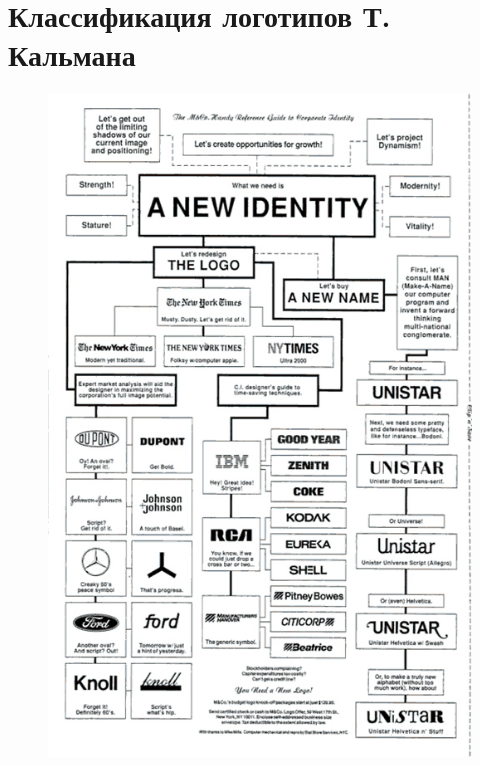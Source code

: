 \section{Классификация логотипов Т. Кальмана}
\label{app:kalman}

\begin{figure}
  \centering
  \includegraphics[width=.7\linewidth]{images/supplement/kalman}
\end{figure}
